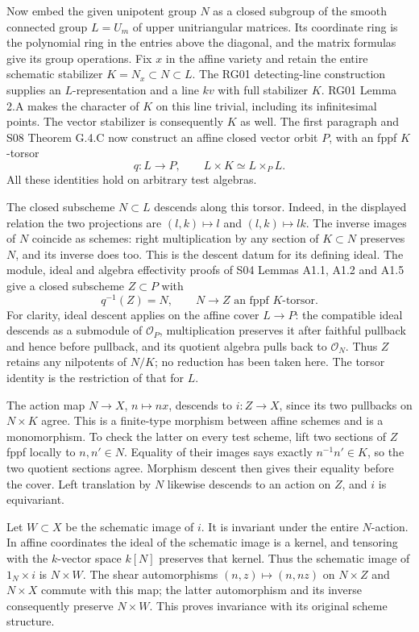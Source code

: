 \documentclass[11pt,a4paper,openany]{report}
\begin{document}
Now embed the given unipotent group \(N\) as a closed subgroup of the smooth connected group \(L=U_m\) of upper unitriangular matrices. Its coordinate ring is the polynomial ring in the entries above the diagonal, and the matrix formulas give its group operations. Fix \(x\) in the affine variety and retain the entire schematic stabilizer \(K=N_x\subset N\subset L\). The RG01 detecting-line construction supplies an \(L\)-representation and a line \(kv\) with full stabilizer \(K\). RG01 Lemma 2.A makes the character of \(K\) on this line trivial, including its infinitesimal points. The vector stabilizer is consequently \(K\) as well. The first paragraph and S08 Theorem G.4.C now construct an affine closed vector orbit \(P\), with an fppf \(K\)-torsor \[
 q:L\longrightarrow P,\qquad
 L\times K\simeq L\times_P L.
\] All these identities hold on arbitrary test algebras.

The closed subscheme \(N\subset L\) descends along this torsor. Indeed, in the displayed relation the two projections are \((l,k)\mapsto l\) and \((l,k)\mapsto lk\). The inverse images of \(N\) coincide as schemes: right multiplication by any section of \(K\subset N\) preserves \(N\), and its inverse does too. This is the descent datum for its defining ideal. The module, ideal and algebra effectivity proofs of S04 Lemmas A1.1, A1.2 and A1.5 give a closed subscheme \(Z\subset P\) with \[
 q^{-1}(Z)=N,\qquad N\longrightarrow Z
 \text{ an fppf }K\text{-torsor}.
\] For clarity, ideal descent applies on the affine cover \(L\to P\): the compatible ideal descends as a submodule of \(\mathcal O_P\), multiplication preserves it after faithful pullback and hence before pullback, and its quotient algebra pulls back to \(\mathcal O_N\). Thus \(Z\) retains any nilpotents of \(N/K\); no reduction has been taken here. The torsor identity is the restriction of that for \(L\).

The action map \(N\to X\), \(n\mapsto nx\), descends to \(i:Z\to X\), since its two pullbacks on \(N\times K\) agree. This is a finite-type morphism between affine schemes and is a monomorphism. To check the latter on every test scheme, lift two sections of \(Z\) fppf locally to \(n,n'\in N\). Equality of their images says exactly \(n^{-1}n'\in K\), so the two quotient sections agree. Morphism descent then gives their equality before the cover. Left translation by \(N\) likewise descends to an action on \(Z\), and \(i\) is equivariant.

Let \(W\subset X\) be the schematic image of \(i\). It is invariant under the entire \(N\)-action. In affine coordinates the ideal of the schematic image is a kernel, and tensoring with the \(k\)-vector space \(k[N]\) preserves that kernel. Thus the schematic image of \(1_N\times i\) is \(N\times W\). The shear automorphisms \((n,z)\mapsto(n,nz)\) on \(N\times Z\) and \(N\times X\) commute with this map; the latter automorphism and its inverse consequently preserve \(N\times W\). This proves invariance with its original scheme structure.
\end{document}
